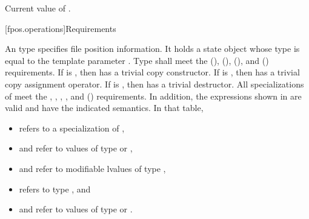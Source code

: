 \begin{itemdescr}
\pnum
\returns
Current value of .
\end{itemdescr}

[fpos.operations]{Requirements}

\pnum
{}%
%
An  type specifies file position information.
It holds a state object
whose type is equal to the template parameter .
Type  shall meet
the  (),
 (),
 (), and
 () requirements.
If  is ,
then  has a trivial copy constructor.
If  is ,
then  has a trivial copy assignment operator.
If  is ,
then  has a trivial destructor.
All specializations of  meet
the ,
,
,
,
and  () requirements.
In addition, the expressions shown in 
are valid and have the indicated semantics.
In that table,
\begin{itemize}
\item {} refers to a specialization of ,
\item {} and  refer to values
of type  or ,
\item {} and  refer to modifiable lvalues of type ,
\item {} refers to type , and
\item {} and  refer to values
of type  or .
\end{itemize}

